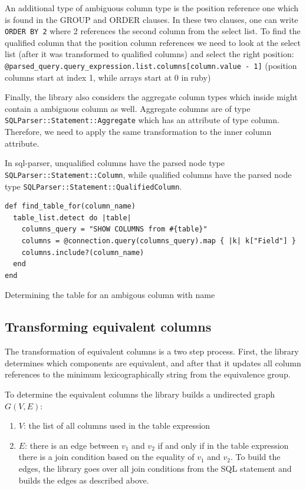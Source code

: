 An additional type of ambiguous column type is the position reference one which is found in the GROUP and ORDER clauses. In these two clauses, one can write \texttt{ORDER BY 2} where 2 references the second column from the select list. To find the qualified column that the position column references we need to look at the select list (after it was transformed to qualified columns) and select the right position: \texttt{@parsed_query.query_expression.list.columns[column.value - 1]} (position columns start at index 1, while arrays start at 0 in ruby)

Finally, the library also considers the aggregate column types which inside might contain a ambiguous column as well. Aggregate columns are of type \texttt{SQLParser::Statement::Aggregate} which has an attribute of type column. Therefore, we need to apply the same transformation to the inner column attribute.

In sql-parser, unqualified columns have the parsed node type \texttt{SQLParser::Statement::Column}, while qualified columns have the parsed node type \texttt{SQLParser::Statement::QualifiedColumn}.

\begin{listing}
\begin{verbatim}
def find_table_for(column_name)
  table_list.detect do |table|
    columns_query = "SHOW COLUMNS from #{table}"
    columns = @connection.query(columns_query).map { |k| k["Field"] }
    columns.include?(column_name)
  end
end
\end{verbatim}
\caption{Determining the table for an ambigous column with name}
\label{fig:find_table}
\end{listing}


\subsection{Transforming equivalent columns}

The transformation of equivalent columns is a two step process. First, the library determines which components are equivalent, and after that it updates all column references to the minimum lexicographically string from the equivalence group.

To determine the equivalent columns the library builds a undirected graph $G(V, E)$:
\begin{enumerate}
    \item $V$: the list of all columns used in the table expression
    \item $E$: there is an edge between $v_1$ and $v_2$ if and only if in the table expression there is a join condition based on the equality of $v_1$ and $v_2$. To build the edges, the library goes over all join conditions from the SQL statement and builds the edges as described above.
\end{enumerate}

